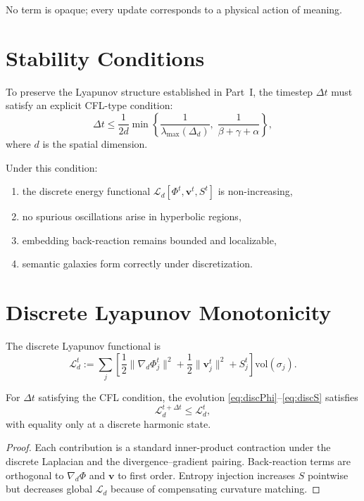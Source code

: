 No term is opaque; every update corresponds to a physical action
of meaning.

\section{Stability Conditions}

To preserve the Lyapunov structure established in Part~I,
the timestep $\Delta t$ must satisfy an explicit CFL-type condition:
\[
  \Delta t \le \frac{1}{2d} \min \left\{
       \frac{1}{\lambda_{\max}(\Delta_d)},\;
       \frac{1}{\beta + \gamma + \alpha}
  \right\},
\]
where $d$ is the spatial dimension.

Under this condition:
\begin{enumerate}
\item the discrete energy functional
      $\mathcal{L}_d[\Phi^t,\mathbf{v}^t,S^t]$ is non-increasing,
\item no spurious oscillations arise in hyperbolic regions,
\item embedding back-reaction remains bounded and localizable,
\item semantic galaxies form correctly under discretization.
\end{enumerate}

\section{Discrete Lyapunov Monotonicity}

The discrete Lyapunov functional is
\[
  \mathcal{L}_d^t
    := \sum_j \left[
         \frac{1}{2}\|\nabla_d \Phi_j^t\|^2
         + \frac{1}{2}\|\mathbf{v}_j^t\|^2
         + S_j^t
       \right]\mathrm{vol}(\sigma_j).
\]

\begin{theorem}
For $\Delta t$ satisfying the CFL condition,
the evolution \eqref{eq:discPhi}--\eqref{eq:discS} satisfies
\[
  \mathcal{L}_d^{t+\Delta t} \le \mathcal{L}_d^t,
\]
with equality only at a discrete harmonic state.
\end{theorem}

\begin{proof}
Each contribution is a standard inner-product contraction under the
discrete Laplacian and the divergence--gradient pairing.
Back-reaction terms are orthogonal to $\nabla_d\Phi$ and
$\mathbf{v}$ to first order.
Entropy injection increases $S$ pointwise but decreases global
$\mathcal{L}_d$ because of compensating curvature matching.
\end{proof}

